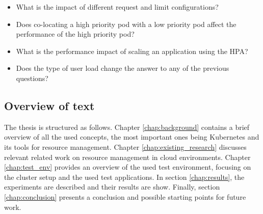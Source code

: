 \begin{itemize}
    \item What is the impact of different request and limit configurations?
    \item Does co-locating a high priority pod with a low priority pod affect the performance of the high priority pod?
    \item What is the performance impact of scaling an application using the HPA?
    \item Does the type of user load change the answer to any of the previous questions?
\end{itemize}



\subsection{Overview of text}
The thesis is structured as follows. Chapter \ref{chap:background} contains a brief overview of all the used concepts, the most important ones being Kubernetes and its tools for resource management. Chapter \ref{chap:existing_research} discusses relevant related work on resource management in cloud environments. Chapter \ref{chap:test_env} provides an overview of the used test environment, focusing on the cluster setup and the used test applications. In section \ref{chap:results}, the experiments are described and their results are show. Finally, section \ref{chap:conclusion} presents a conclusion and possible starting points for future work.
